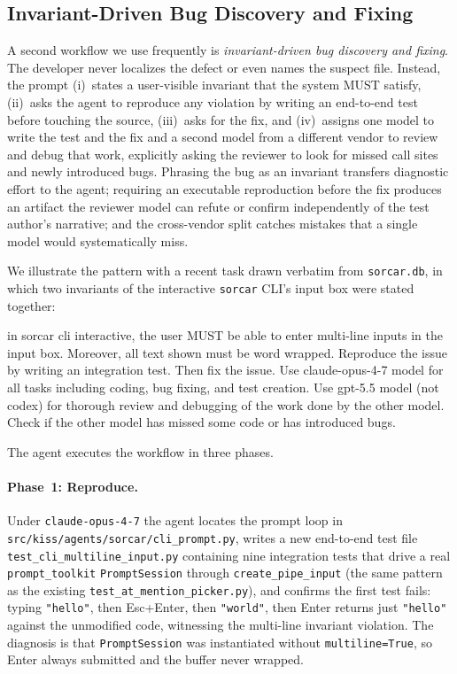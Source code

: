 \documentclass{article}
\begin{document}
\subsection{Invariant-Driven Bug Discovery and Fixing}
\label{sec:painless-invariants}

A second workflow we use frequently is \emph{invariant-driven bug discovery and fixing}.  The developer never localizes the defect or even names the suspect file.  Instead, the prompt (i)~states a user-visible invariant that the system MUST satisfy, (ii)~asks the agent to reproduce any violation by writing an end-to-end test before touching the source, (iii)~asks for the fix, and (iv)~assigns one model to write the test and the fix and a second model from a different vendor to review and debug that work, explicitly asking the reviewer to look for missed call sites and newly introduced bugs.  Phrasing the bug as an invariant transfers diagnostic effort to the agent; requiring an executable reproduction before the fix produces an artifact the reviewer model can refute or confirm independently of the test author's narrative; and the cross-vendor split catches mistakes that a single model would systematically miss.

We illustrate the pattern with a recent task drawn verbatim from \texttt{sorcar.db}, in which two invariants of the interactive \texttt{sorcar} CLI's input box were stated together:

\begin{prompt}
in sorcar cli interactive, the user MUST be able to enter multi-line inputs in
the input box.  Moreover, all text shown must be word wrapped.  Reproduce the
issue by writing an integration test. Then fix the issue. Use claude-opus-4-7
model for all tasks including coding, bug fixing, and test creation. Use gpt-5.5
model (not codex) for thorough review and debugging of the work done by the
other model. Check if the other model has missed some code or has introduced
bugs.
\end{prompt}

\noindent The agent executes the workflow in three phases.

\paragraph{Phase~1: Reproduce.} Under \texttt{claude-opus-4-7} the agent locates the prompt loop in \texttt{src/kiss/agents/sorcar/cli\_prompt.py}, writes a new end-to-end test file \texttt{test\_cli\_multiline\_input.py} containing nine integration tests that drive a real \texttt{prompt\_toolkit} \texttt{PromptSession} through \texttt{create\_pipe\_input} (the same pattern as the existing \texttt{test\_at\_mention\_picker.py}), and confirms the first test fails: typing \texttt{"hello"}, then Esc+Enter, then \texttt{"world"}, then Enter returns just \texttt{"hello"} against the unmodified code, witnessing the multi-line invariant violation.  The diagnosis is that \texttt{PromptSession} was instantiated without \texttt{multiline=True}, so Enter always submitted and the buffer never wrapped.
\end{document}
